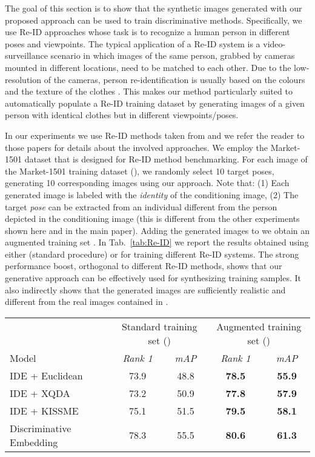 \documentclass[10pt,twocolumn,letterpaper]{article}
\begin{document}
The goal of this section is to show that the synthetic images generated with our proposed approach can be used to train discriminative methods. Specifically, we use Re-ID approaches whose task is to recognize a human person in different poses and viewpoints. The typical application  of a Re-ID system is a video-surveillance  scenario  in which
 images of the same person, grabbed by 
cameras mounted in different  locations, need to be matched to  each other. Due to the low-resolution of the cameras, person re-identification is usually based on the colours and the texture of the clothes  \cite{DBLP:journals/corr/ZhengYH16}. This makes our method particularly suited to automatically populate a Re-ID training dataset by generating images of a given person with identical clothes but in different viewpoints/poses. 

In our   experiments we use   
Re-ID methods taken from \cite{DBLP:journals/corr/ZhengYH16,DBLP:journals/tomccap/ZhengZY18} and we refer the reader to those papers for details about the involved approaches.
We employ the Market-1501 dataset that is designed for Re-ID method benchmarking.
For each image of the Market-1501 training dataset (), we randomly select 10 target poses, generating 10 corresponding images using our approach.
Note that: (1) Each generated image is labeled with the {\em identity} of the conditioning image, (2) 
The target {\em pose} can be extracted from an individual different from the person depicted in the conditioning image
(this is different from the other experiments shown here and in the main paper).
Adding the generated images to  we obtain an augmented training set . 
In Tab.~\ref{tab:Re-ID} 
we report the results obtained using either  (standard procedure) or 
for training different Re-ID systems.
 The strong performance boost, orthogonal to different Re-ID methods,
shows that our generative approach can be effectively used 
 for synthesizing training samples.
It also indirectly shows that the generated images are sufficiently realistic and different from the real images contained in .

\begin{table*}[h]
\caption{Accuracy of Re-ID methods  on the Market-1501 test set ()}
\centering
\begin{tabular}{l|cc|cc}
  \hline
  &\multicolumn{2}{c|}{Standard training set ()}&\multicolumn{2}{c}{Augmented training set ()}\\
 Model &\emph{Rank 1} & \emph{mAP} & \emph{Rank 1} & \emph{mAP} \\
\hline
IDE + Euclidean \cite{DBLP:journals/corr/ZhengYH16}    &  73.9  &  48.8 &  \bf 78.5 & \bf 55.9  \\
IDE + XQDA \cite{DBLP:journals/corr/ZhengYH16}           &  73.2  &  50.9  & \bf  77.8 & \bf 57.9  \\
IDE + KISSME \cite{DBLP:journals/corr/ZhengYH16}        &  75.1  &  51.5 &  \bf 79.5 & \bf 58.1  \\
Discriminative Embedding \cite{DBLP:journals/tomccap/ZhengZY18}  &  78.3  &  55.5  &  \bf 80.6 & \bf 61.3  \\
\hline
\end{tabular}
\label{tab:Re-ID}
\end{table*} 
 
\end{document}
